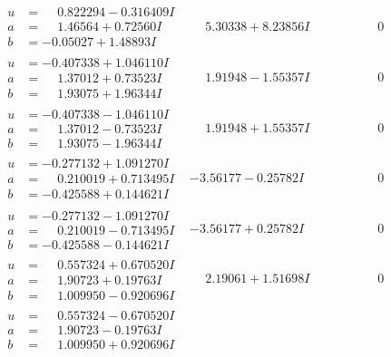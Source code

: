 \documentclass[1p]{elsarticle_modified}
\theoremstyle{definition}
\begin{document}
$$\begin{array}{c|c|c}
\begin{aligned}
u &= \phantom{-}0.822294 - 0.316409 I \\
a &= \phantom{-}1.46564 + 0.72560 I \\
b &= -0.05027 + 1.48893 I\end{aligned}
 & \phantom{-}5.30338 + 8.23856 I & \phantom{-0.000000 } 0 \\ \hline\begin{aligned}
u &= -0.407338 + 1.046110 I \\
a &= \phantom{-}1.37012 + 0.73523 I \\
b &= \phantom{-}1.93075 + 1.96344 I\end{aligned}
 & \phantom{-}1.91948 - 1.55357 I & \phantom{-0.000000 } 0 \\ \hline\begin{aligned}
u &= -0.407338 - 1.046110 I \\
a &= \phantom{-}1.37012 - 0.73523 I \\
b &= \phantom{-}1.93075 - 1.96344 I\end{aligned}
 & \phantom{-}1.91948 + 1.55357 I & \phantom{-0.000000 } 0 \\ \hline\begin{aligned}
u &= -0.277132 + 1.091270 I \\
a &= \phantom{-}0.210019 + 0.713495 I \\
b &= -0.425588 + 0.144621 I\end{aligned}
 & -3.56177 - 0.25782 I & \phantom{-0.000000 } 0 \\ \hline\begin{aligned}
u &= -0.277132 - 1.091270 I \\
a &= \phantom{-}0.210019 - 0.713495 I \\
b &= -0.425588 - 0.144621 I\end{aligned}
 & -3.56177 + 0.25782 I & \phantom{-0.000000 } 0 \\ \hline\begin{aligned}
u &= \phantom{-}0.557324 + 0.670520 I \\
a &= \phantom{-}1.90723 + 0.19763 I \\
b &= \phantom{-}1.009950 - 0.920696 I\end{aligned}
 & \phantom{-}2.19061 + 1.51698 I & \phantom{-0.000000 } 0 \\ \hline\begin{aligned}
u &= \phantom{-}0.557324 - 0.670520 I \\
a &= \phantom{-}1.90723 - 0.19763 I \\
b &= \phantom{-}1.009950 + 0.920696 I\end{aligned}

\end{array}$$
\end{document}
